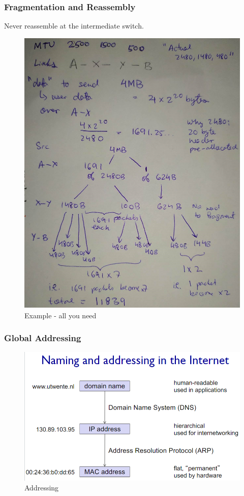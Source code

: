\documentclass[11pt, a4paper]{article}
\begin{document}
\subsubsection{Fragmentation and Reassembly}
Never reassemble at the intermediate switch.
\begin{figure}[H]
    \centering
    \includegraphics[width = \textwidth]{Pictures/MTU fragmentation.png}
    \caption{Example - all you need}
    \label{fig:example}
\end{figure}

\subsubsection{Global Addressing}
\begin{figure}[H]
    \centering
    \includegraphics[width = \textwidth]{Pictures/Addressing.png}
    \caption{Addressing}
    \label{fig:my_label}
\end{figure}
\end{document}
